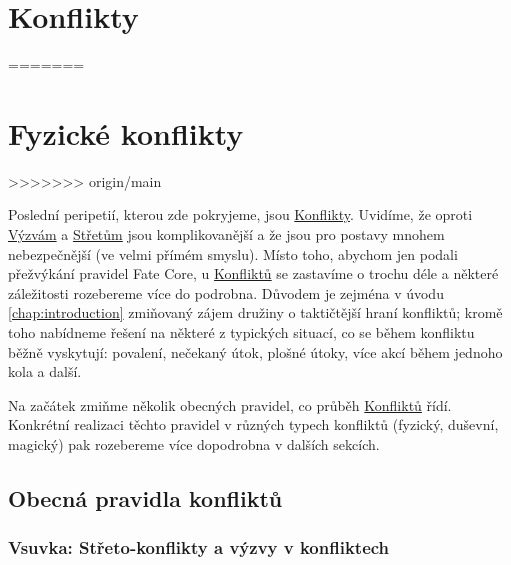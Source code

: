 \documentclass[../main.tex]{subfiles}
\begin{document}
\section{Konflikty}
=======

\section{Fyzické konflikty}
>>>>>>> origin/main
\label{sec:boj}

Poslední peripetií, kterou zde pokryjeme, jsou \underline{Konflikty}. Uvidíme, že oproti \underline{Výzvám} a \underline{Střetům} jsou komplikovanější a že jsou pro postavy mnohem nebezpečnější (ve velmi přímém smyslu). Místo toho, abychom jen podali přežvýkání pravidel Fate Core, u \underline{Konfliktů} se zastavíme o trochu déle a některé záležitosti rozebereme více do podrobna. Důvodem je zejména v úvodu \ref{chap:introduction} zmiňovaný zájem družiny o taktičtější hraní konfliktů; kromě toho nabídneme řešení na některé z typických situací, co se během konfliktu běžně vyskytují: povalení, nečekaný útok, plošné útoky, více akcí během jednoho kola a další.

Na začátek zmiňme několik obecných pravidel, co průběh \underline{Konfliktů} řídí. Konkrétní realizaci těchto pravidel v různých typech konfliktů (fyzický, duševní, magický) pak rozebereme více dopodrobna v dalších sekcích.

\subsection{Obecná pravidla konfliktů}
\label{sec:obecna-pravidla}

\subsubsection{Vsuvka: Střeto-konflikty a výzvy v konfliktech}
\label{sec:hybrid}
\end{document}
